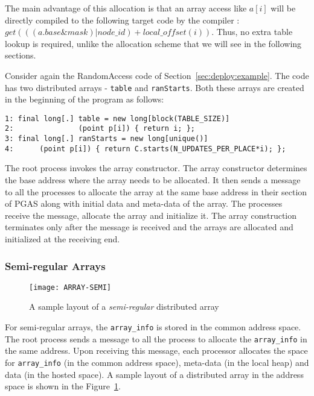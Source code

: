 The main advantage of this allocation is that an array access like $a[i]$ will
be directly compiled to the following target code by the compiler : $get(((a.base \& mask) | node\_id) + local\_offset(i))$.
Thus, no extra table lookup is required, unlike the allocation scheme that we will see in the following
sections.

Consider again the RandomAccess code of Section~\ref{sec:deploy:example}. The code
has two distributed arrays - {\tt table} and {\tt ranStarts}. Both these arrays
are created in the beginning of the program as follows:

\begin{verbatim}
1: final long[.] table = new long[block(TABLE_SIZE)] 
2:               (point p[i]) { return i; };
3: final long[.] ranStarts = new long[unique()]
4:		(point p[i]) { return C.starts(N_UPDATES_PER_PLACE*i); };
\end{verbatim}

The root process invokes the array constructor. The array constructor
determines the base address where the array needs to be allocated. It then
sends a message to all the processes to allocate the array at the same
base address in their section of PGAS along with initial data
and meta-data of the array. The processes receive the message,
allocate the array and initialize it. The array construction terminates only
after the message is received and the arrays are allocated and initialized
at the receiving end.

\subsubsection{Semi-regular Arrays}

\begin{figure}
\center
\texttt{[image: ARRAY-SEMI]}
\caption{A sample layout of a {\em semi-regular} distributed array}
\label{fig:array_layout_semiregular}
\end{figure}

For semi-regular arrays, the
{\tt array\_info} is stored in the common address space. The root process
sends a message to all the process to allocate the {\tt array\_info}
in the same address. Upon receiving this message, each processor
allocates the space for {\tt array\_info} (in the common address space), meta-data 
(in the local heap) and data (in the hosted space). A sample layout of a
distributed array in the address space is shown in the Figure~\ref{fig:array_layout_semiregular}.

